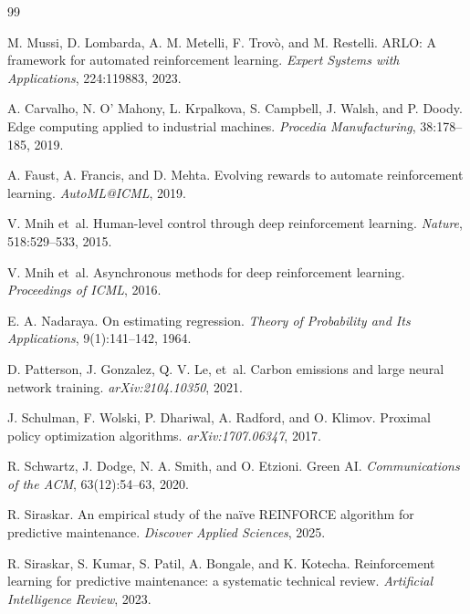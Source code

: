 \documentclass[11pt]{article}
\begin{document}
\begin{thebibliography}{99}

M. Mussi, D. Lombarda, A. M. Metelli, F. Trov\`o, and M. Restelli.
ARLO: A framework for automated reinforcement learning.
\emph{Expert Systems with Applications}, 224:119883, 2023.

A. Carvalho, N. O' Mahony, L. Krpalkova, S. Campbell, J. Walsh, and P. Doody.
Edge computing applied to industrial machines.
\emph{Procedia Manufacturing}, 38:178--185, 2019.

A. Faust, A. Francis, and D. Mehta.
Evolving rewards to automate reinforcement learning.
\emph{AutoML@ICML}, 2019.

V. Mnih et~al.
Human-level control through deep reinforcement learning.
\emph{Nature}, 518:529--533, 2015.

V. Mnih et~al.
Asynchronous methods for deep reinforcement learning.
\emph{Proceedings of ICML}, 2016.

E. A. Nadaraya.
On estimating regression.
\emph{Theory of Probability and Its Applications}, 9(1):141--142, 1964.

D. Patterson, J. Gonzalez, Q. V. Le, et~al.
Carbon emissions and large neural network training.
\emph{arXiv:2104.10350}, 2021.

J. Schulman, F. Wolski, P. Dhariwal, A. Radford, and O. Klimov.
Proximal policy optimization algorithms.
\emph{arXiv:1707.06347}, 2017.

R. Schwartz, J. Dodge, N. A. Smith, and O. Etzioni.
Green AI.
\emph{Communications of the ACM}, 63(12):54--63, 2020.

R. Siraskar.
An empirical study of the na\"{i}ve REINFORCE algorithm for predictive maintenance.
\emph{Discover Applied Sciences}, 2025.

R. Siraskar, S. Kumar, S. Patil, A. Bongale, and K. Kotecha.
Reinforcement learning for predictive maintenance: a systematic technical review.
\emph{Artificial Intelligence Review}, 2023.


\end{thebibliography}
\end{document}
